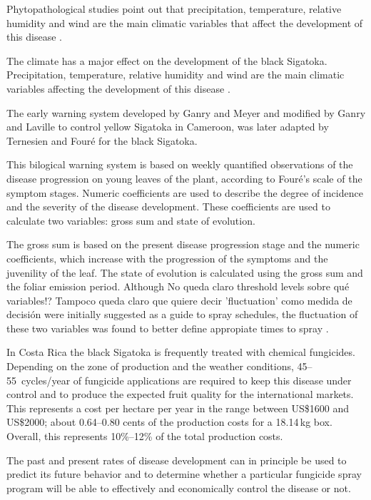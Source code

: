 Phytopathological studies point out that precipitation, temperature,
relative humidity and wind are the main climatic variables that affect
the development of this disease \citep{MarinVargas1995}.

The climate has a major effect on the development of the black
Sigatoka.  Precipitation, temperature, relative humidity and wind are
the main climatic variables affecting the development of this disease
\citep{MarinVargas1995}.

The early warning system developed by Ganry and Meyer
\citep{ganry1972} and modified by Ganry and Laville \citep{ganry1983}
to control yellow Sigatoka in Cameroon, was later adapted by
Ternesien \citep{Ternesien1985} and Fouré \citep{foure1988} for the
black Sigatoka.

This bilogical warning system is based on weekly quantified
observations of the disease progression on young leaves of the plant,
according to Fouré's scale of the symptom stages.
%
Numeric coefficients are used to describe the degree of incidence and
the severity of the disease development.  These coefficients are used
to calculate two variables: gross sum and state of evolution.

The gross sum is based on the present disease progression stage and
the numeric coefficients, which increase with the progression of
the symptoms and the juvenility of the leaf.
%
The state of evolution is calculated using the gross sum and the
foliar emission period.
%
Although %
{No queda claro threshold levels sobre qué variables!?  Tampoco
  queda claro que quiere decir 'fluctuation' como medida de decisión}
%
were initially suggested as a guide to spray
schedules, the fluctuation of these two variables
was found to better define appropiate times to spray
\citep{Marinetal2003}.

In Costa Rica the black Sigatoka is frequently treated with
chemical fungicides.
%
Depending on the zone of production and the weather conditions,
45--55~cycles/year of fungicide applications are required to keep this
disease under control and to produce the expected fruit quality for the
international markets.
%
This represents a cost per hectare per year in the range between US\$1600 and
US\$2000; about 0.64--0.80 cents of the production costs for a
18.14\,kg box.
%
Overall, this represents 10\%--12\% of the total production costs.

The past and present rates of disease development can in principle be used
to predict its future behavior and to determine whether
a particular fungicide spray program will be able to effectively and
economically control the disease \citep{ChuangJeger1987} or not.

